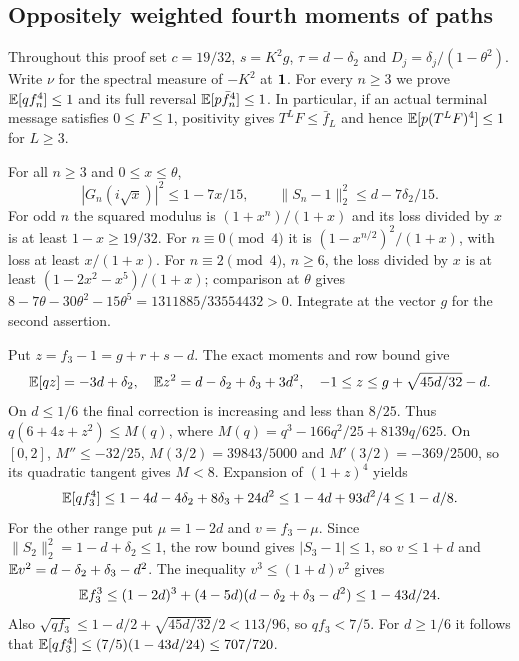 \subsection{Oppositely weighted fourth moments of paths}\label{loc:S20}
Throughout this proof set $c=19/32$, $s=K^2g$, $\tau=d-\delta_{2}$ and $D_j=\delta_{j}/(1-\theta^2)$. Write $\nu$ for the spectral measure of $-K^2$ at $\mathbf1$.
For every $n\ge3$ we prove $\mathbb E[qf_n^4]\le1$ and its full reversal
$\mathbb E[p\bar f_{n}^4]\le1$. In particular, if an actual terminal message satisfies
$0\le F\le1$, positivity gives $T^LF\le \bar f_{L}$ and hence
$\mathbb E[p(T^LF)^4]\le1$ for $L\ge3$.

For all $n\ge3$ and $0\le x\le\theta$,
\begin{equation}\label{eq:compact-G-loss}
 |G_n(i\sqrt x)|^2\le1-7x/15,\qquad
 \|S_n-1\|_2^2\le d-7\delta_{2}/15.
\end{equation}
For odd $n$ the squared modulus is $(1+x^n)/(1+x)$ and its loss divided
by $x$ is at least $1-x\ge19/32$.
For $n\equiv0\pmod4$ it is $(1-x^{n/2})^2/(1+x)$, with loss at least
$x/(1+x)$. For $n\equiv2\pmod4$, $n\ge6$, the loss divided by $x$
is at least $(1-2x^2-x^5)/(1+x)$; comparison at $\theta$ gives
$8-7\theta-30\theta^2-15\theta^5=1311885/33554432>0$.
Integrate at the vector $g$ for the second assertion.

Put $z=f_3-1=g+r+s-d$. The exact moments and row bound give
\[
 \mathbb E[qz]=-3d+\delta_{2},\quad \mathbb E z^2=d-\delta_{2}+\delta_{3}+3d^2,\quad
 -1\le z\le g+\sqrt{45d/32}-d.
\]
On $d\le1/6$ the final correction is increasing and less than $8/25$.
Thus $q(6+4z+z^2)\le M(q)$, where
$M(q)=q^3-166q^2/25+8139q/625$.
On $[0,2]$, $M''\le-32/25$, $M(3/2)=39843/5000$ and
$M'(3/2)=-369/2500$, so its quadratic tangent gives $M<8$.
Expansion of $(1+z)^4$ yields
\[
 \mathbb E[qf_3^4]\le1-4d-4\delta_{2}+8\delta_{3}+24d^2
 \le1-4d+93d^2/4\le1-d/8.
\]
For the other range put $\mu=1-2d$ and $v=f_3-\mu$.
Since $\|S_2\|_2^2=1-d+\delta_{2}\le1$, the row bound gives
$|S_3-1|\le1$, so $v\le1+d$ and
$\mathbb E v^2=d-\delta_{2}+\delta_{3}-d^2$.
The inequality $v^3\le(1+d)v^2$ gives
\[
 \mathbb E f_3^3\le(1-2d)^3+(4-5d)(d-\delta_{2}+\delta_{3}-d^2)
 \le1-43d/24.
\]
Also $\sqrt{qf_3}\le1-d/2+\sqrt{45d/32}/2<113/96$,
so $qf_3<7/5$. For $d\ge1/6$ it follows that
$\mathbb E[qf_3^4]\le(7/5)(1-43d/24)\le707/720$.

